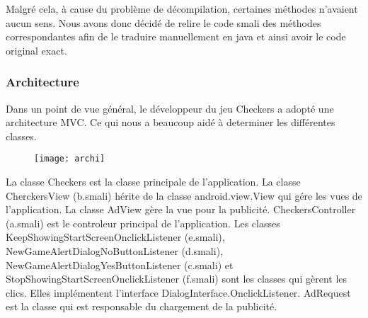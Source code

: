 Malgré cela, à cause du problème de décompilation, certaines méthodes n'avaient aucun sens.
Nous avons donc décidé de relire le code smali des méthodes correspondantes afin de le traduire manuellement en java et ainsi avoir le code original exact.

\subsubsection{Architecture}
Dans un point de vue général, le développeur du jeu Checkers a adopté une architecture MVC.
Ce qui nous a beaucoup aidé à determiner les différentes classes.\\
\begin{figure}[hp]
	      \begin{center}
		\texttt{[image: archi]}
	      \end{center}
\end{figure}
La classe Checkers est la classe principale de l’application.
La classe CherckersView (b.smali) hérite de la classe android.view.View qui gére les vues de l’application. La classe AdView gère la vue pour la publicité.
CheckersController (a.smali) est le controleur principal de l’application. Les classes KeepShowingStartScreenOnclickListener (e.smali), NewGameAlertDialogNoButtonListener (d.smali), NewGameAlertDialogYesButtonListener (c.smali) et StopShowingStartScreenOnclickListener (f.smali) sont les classes qui gèrent les clics.
Elles implémentent l'interface DialogInterface.OnclickListener.
AdRequest est la classe qui est responsable du chargement de la publicité.
